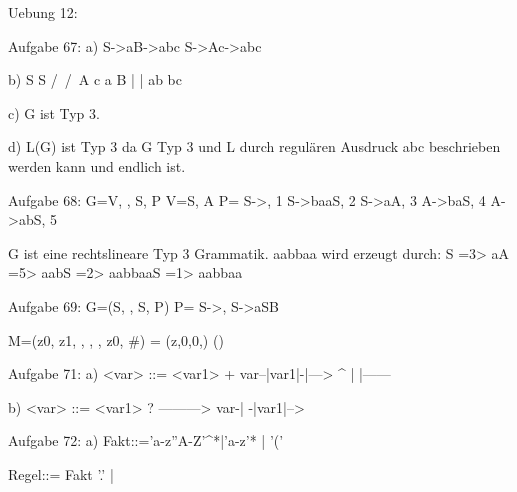 Uebung 12:

Aufgabe 67:
a)
S->aB->abc
S->Ac->abc

b)
  S		S
  /\	/\
  A c	a B
  |		  |
 ab		  bc
 
c)
G ist Typ 3.

d)
L(G) ist Typ 3 da G Typ 3 und L
durch regulären Ausdruck abc beschrieben werden kann und endlich ist.


Aufgabe 68:
G={V, \sigma, S, P}
V={S, A}
P={
S->\epsilon,	1
S->baaS,		2
S->aA,			3
A->baS,			4
A->abS,			5
}

G ist eine rechtslineare Typ 3 Grammatik.
aabbaa wird erzeugt durch:
S =3> aA =5> aabS =2> aabbaaS =1> aabbaa


Aufgabe 69:
G=(S, \Sigma, S, P)
P={
S->\epsilon,
S->aSB
}

M=({z0, z1}, \Sigma, \Gamma, \Delta, z0, #)
\Delta ={
(z,0,0,\epsilon)
()
}


Aufgabe 71:
a) <var> ::= <var1> +
var--|var1|-|--->
	 ^		|
	 |------

b) <var> ::= <var1> ?
	 --------->
var-|
     -|var1|-->


Aufgabe 72:
a)
Fakt::='a-z''A-Z'^*|'a-z'* | '(' 

Regel::= Fakt '.' | 